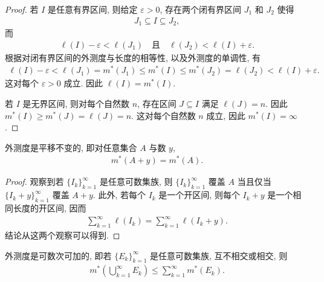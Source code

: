 \documentclass[../../main.tex]{subfiles}
\begin{document}
\begin{proof}
若 $I$ 是任意有界区间, 则给定 $\varepsilon>0$, 存在两个闭有界区间 $J_{1}$ 和 $J_{2}$ 使得
\begin{align*}
J_{1}\subseteq I\subseteq J_{2},
\end{align*}
而
\begin{align*}
\ell(I)-\varepsilon<\ell(J_{1})\quad\text{且}\quad\ell(J_{2})<\ell(I)+\varepsilon.
\end{align*}
根据对闭有界区间的外测度与长度的相等性, 以及外测度的单调性, 有
\begin{align*}
\ell(I)-\varepsilon<\ell(J_{1})=m^{*}(J_{1})\leqslant m^{*}(I)\leqslant m^{*}(J_{2})=\ell(J_{2})<\ell(I)+\varepsilon.
\end{align*}
这对每个 $\varepsilon>0$ 成立. 因此 $\ell(I)=m^{*}(I)$.

若 $I$ 是无界区间, 则对每个自然数 $n$, 存在区间 $J\subseteq I$ 满足 $\ell(J)=n$. 因此 $m^{*}(I)\geqslant m^{*}(J)=\ell(J)=n$. 这对每个自然数 $n$ 成立, 因此 $m^{*}(I)=\infty$.
\end{proof}

\begin{proposition}[外测度平移不变]\label{proposition:ch02-外测度平移}
外测度是平移不变的, 即对任意集合 $A$ 与数 $y$,
\begin{align*}
m^{*}(A+y)=m^{*}(A).
\end{align*}
\end{proposition}

\begin{proof}
观察到若 $\{I_{k}\}_{k=1}^{\infty}$ 是任意可数集族, 则 $\{I_{k}\}_{k=1}^{\infty}$ 覆盖 $A$ 当且仅当 $\{I_{k}+y\}_{k=1}^{\infty}$ 覆盖 $A+y$. 此外, 若每个 $I_{k}$ 是一个开区间, 则每个 $I_{k}+y$ 是一个相同长度的开区间, 因而
\begin{align*}
\sum_{k=1}^{\infty}\ell(I_{k})=\sum_{k=1}^{\infty}\ell(I_{k}+y).
\end{align*}
结论从这两个观察可以得到.
\end{proof}

\begin{proposition}[外测度可数次可加]\label{proposition:ch02-外测度次可加}
外测度是可数次可加的, 即若 $\{E_{k}\}_{k=1}^{\infty}$ 是任意可数集族, 互不相交或相交, 则
\begin{align*}
m^{*}\left(\bigcup_{k=1}^{\infty}E_{k}\right)\leqslant\sum_{k=1}^{\infty}m^{*}(E_{k}).
\end{align*}
\end{proposition}
\end{document}
